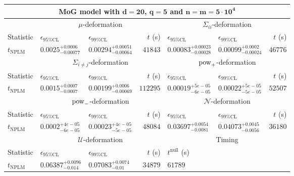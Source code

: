 \begin{tabular}{l|llr|llr}
	\toprule
	\multicolumn{7}{c}{{\bf MoG model with $\mathbf{d=20}$, $\mathbf{q=5}$ and $\mathbf{n=m=5\cdot 10^{4}}$}} \\
	\toprule
	\multicolumn{1}{c}{} & \multicolumn{3}{c}{$\mu$-deformation} & \multicolumn{3}{c}{$\Sigma_{ii}$-deformation} \\
	Statistic & $\epsilon_{95\%\mathrm{CL}}$ & $\epsilon_{99\%\mathrm{CL}}$ & $t$ (s) & $\epsilon_{95\%\mathrm{CL}}$ & $\epsilon_{99\%\mathrm{CL}}$ & $t$ (s) \\
	\midrule
	$t_{\mathrm{NPLM}}$ & $0.0025_{-0.00077}^{+0.0006}$ & $0.00294_{-0.00064}^{+0.00051}$ & $41843$ & $0.00083_{-0.00028}^{+0.00023}$ & $0.00099_{-0.00024}^{+0.0002}$ & $46776$ \\
	\toprule
	\multicolumn{1}{c}{} & \multicolumn{3}{c}{$\Sigma_{i\neq j}$-deformation} & \multicolumn{3}{c}{$\rm{pow}_{+}$-deformation} \\
	Statistic & $\epsilon_{95\%\mathrm{CL}}$ & $\epsilon_{99\%\mathrm{CL}}$ & $t$ (s) & $\epsilon_{95\%\mathrm{CL}}$ & $\epsilon_{99\%\mathrm{CL}}$ & $t$ (s) \\
	\midrule
	$t_{\mathrm{NPLM}}$ & $0.0015_{-0.0007}^{+0.0007}$ & $0.00199_{-0.00069}^{+0.0006}$ & $112295$ & $0.00019_{-6e-05}^{+5e-05}$ & $0.00022_{-5e-05}^{+5e-05}$ & $52507$ \\
	\toprule
	\multicolumn{1}{c}{} & \multicolumn{3}{c}{$\rm{pow}_{-}$-deformation} & \multicolumn{3}{c}{$\mathcal{N}$-deformation} \\
	Statistic & $\epsilon_{95\%\mathrm{CL}}$ & $\epsilon_{99\%\mathrm{CL}}$ & $t$ (s) & $\epsilon_{95\%\mathrm{CL}}$ & $\epsilon_{99\%\mathrm{CL}}$ & $t$ (s) \\
	\midrule
	$t_{\mathrm{NPLM}}$ & $0.0002_{-6e-05}^{+4e-05}$ & $0.00023_{-5e-05}^{+4e-05}$ & $48084$ & $0.03697_{-0.0081}^{+0.0054}$ & $0.04073_{-0.0056}^{+0.0045}$ & $36180$ \\
	\toprule
	\multicolumn{1}{c}{} & \multicolumn{3}{c}{$\mathcal{U}$-deformation} & \multicolumn{3}{c}{Timing} \\
	Statistic & $\epsilon_{95\%\mathrm{CL}}$ & $\epsilon_{99\%\mathrm{CL}}$ & $t$ (s) & $t^{\mathrm{null}}$ (s) \\
	\midrule
	$t_{\mathrm{NPLM}}$ & $0.06387_{-0.014}^{+0.0096}$ & $0.07083_{-0.01}^{+0.0074}$ & $34879$ & $61789$ \\
	\bottomrule
\end{tabular}
